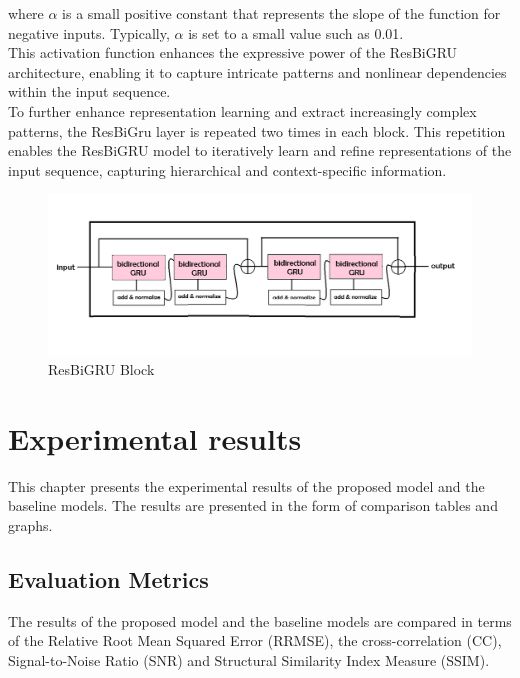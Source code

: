 \documentclass[a4paper, noexaminfo]{sapthesis}
\begin{document}
where \( \alpha \) is a small positive constant that represents 
the slope of the function for negative inputs. Typically, 
\( \alpha \) is set to a small value such as 0.01. \newline \\
This activation function 
enhances the expressive power of the ResBiGRU architecture, enabling 
it to capture intricate patterns and nonlinear dependencies within the 
input sequence.\newline \\
To further enhance representation learning and extract increasingly 
complex patterns, the ResBiGru layer is repeated two times in each block. This 
repetition enables the ResBiGRU model to iteratively learn and refine 
representations of the input sequence, capturing hierarchical and 
context-specific information. \newline
\begin{figure}[h!]
    \centering
    \includegraphics[width=1\linewidth]{images/resbigru.png}
    \caption{ResBiGRU Block}
    \end{figure}
\chapter{Experimental results}
This chapter presents the experimental results of the proposed model and
the baseline models. The results are presented in the form of comparison tables
and graphs. 
\section{Evaluation Metrics}
The results of the proposed model and the baseline models are compared 
in terms of the Relative Root Mean Squared Error (RRMSE), the cross-correlation (CC),
Signal-to-Noise Ratio (SNR) and Structural Similarity Index Measure (SSIM).
\end{document}
